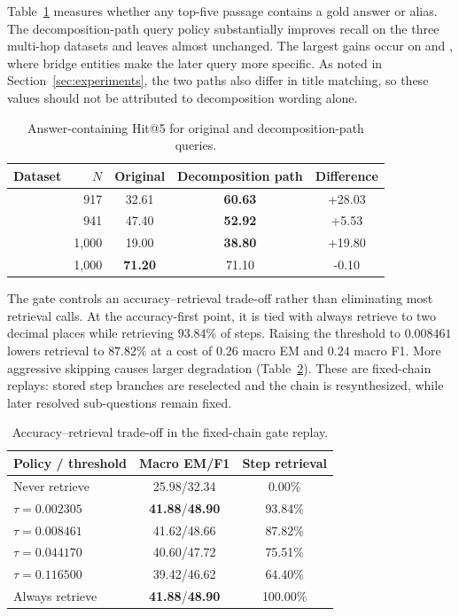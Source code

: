 Table~\ref{tab:retrieval-recall} measures whether any top-five passage contains
a gold answer or alias. The decomposition-path query policy substantially
improves recall on the three multi-hop datasets and leaves \popqa{} almost
unchanged. The largest gains occur on \twowiki{} and \musique{}, where bridge
entities make the later query more specific. As noted in
Section~\ref{sec:experiments}, the two paths also differ in title matching, so
these values should not be attributed to decomposition wording alone.

\begin{table}[t]
\caption{Answer-containing Hit@5 for original and decomposition-path queries.}
\label{tab:retrieval-recall}
\centering
\small
\setlength{\tabcolsep}{5pt}
\begin{tabular}{lrccc}
\toprule
Dataset & \(N\) & Original & Decomposition path & Difference \\
\midrule
\twowiki{} & 917 & 32.61 & \textbf{60.63} & +28.03 \\
\hotpot{} & 941 & 47.40 & \textbf{52.92} & +5.53 \\
\musique{} & 1,000 & 19.00 & \textbf{38.80} & +19.80 \\
\popqa{} & 1,000 & \textbf{71.20} & 71.10 & -0.10 \\
\bottomrule
\end{tabular}
\end{table}

The gate controls an accuracy--retrieval trade-off rather than eliminating
most retrieval calls. At the accuracy-first point, it is tied with always
retrieve to two decimal places while retrieving \(93.84\%\) of steps. Raising
the threshold to \(0.008461\) lowers retrieval to \(87.82\%\) at a cost of
\(0.26\) macro EM and \(0.24\) macro F1. More aggressive skipping causes
larger degradation (Table~\ref{tab:gate-sweep}). These are fixed-chain
replays: stored step branches are reselected and the chain is resynthesized,
while later resolved sub-questions remain fixed.

\begin{table}[t]
\caption{Accuracy--retrieval trade-off in the fixed-chain gate replay.}
\label{tab:gate-sweep}
\centering
\small
\setlength{\tabcolsep}{8pt}
\begin{tabular}{lcc}
\toprule
Policy / threshold & Macro EM/F1 & Step retrieval \\
\midrule
Never retrieve & 25.98/32.34 & 0.00\% \\
\(\tau=0.002305\) & \textbf{41.88}/\textbf{48.90} & 93.84\% \\
\(\tau=0.008461\) & 41.62/48.66 & 87.82\% \\
\(\tau=0.044170\) & 40.60/47.72 & 75.51\% \\
\(\tau=0.116500\) & 39.42/46.62 & 64.40\% \\
Always retrieve & \textbf{41.88}/\textbf{48.90} & 100.00\% \\
\bottomrule
\end{tabular}
\end{table}

